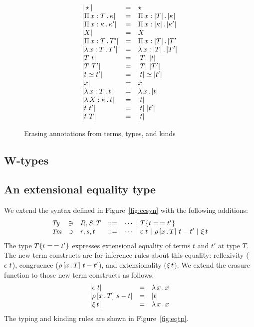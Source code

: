 \documentclass{article}
\begin{document}
\begin{figure}
  \[
  \begin{array}{lll}
    |\star| & = & \star \\
    |\Pia{x}{T}{\kappa}| & = & \Pia{x}{|T|}{|\kappa|} \\
    |\Pia{x}{\kappa}{\kappa'}| & = & \Pia{x}{|\kappa|}{|\kappa'|} \\
    |X| & = & X \\
    |\Pia{x}{T}{T'}| & = & \Pia{x}{|T|}{|T'} \\
    |\tlam{x}{T}{T'}| & = & \tlam{x}{|T|}{|T'|} \\
    |T\ t| & = & |T|\ |t| \\
    |T\ T'| & = & |T|\ |T'| \\
    |t \simeq t'| & = & |t| \simeq |t'| \\
    |x| & = & x \\
    |\tlam{x}{T}{t}| & = & \lam{x}{|t|} \\
    |\tlam{X}{\kappa}{t}| & = & |t| \\
    |t\ t'| & = & |t|\ |t'| \\
    |t\ T| & = & |t| 
  \end{array}
  \]
  \caption{Erasing annotations from terms, types, and kinds}
  \label{fig:erase}
\end{figure}


\subsection{W-types}


\subsection{An extensional equality type}

We extend the syntax defined in Figure~\ref{fig:ccsyn} with the following additions:
\[
\begin{array}{lllll}
  \textit{Ty} & \ni & R,S,T & ::= & \cdots\ |\ \eqtm{t}{T}{t'} \\
  \textit{Tm} & \ni & r,s,t & ::= & \cdots\ |\ \rfl{t}\ |\ \cng{x}{T}{t}{t'}\ |\ \ext{t}
\end{array}
\]
\noindent The type $\eqtm{t}{T}{t'}$ expresses extensional equality of terms $t$ and $t'$ at type $T$.  The new term constructs are for inference
rules about this equality: reflexivity ($\rfl{t}$), congruence ($\cng{x}{T}{t}{t'}$), and extensionality ($\ext{t}$).
We extend the erasure function to those new term constructs as follows:
\[
\begin{array}{lll}
  |\rfl{t}| & = & \lam{x}{x} \\
  |\cng{x}{T}{s}{t}| & = & |t| \\
  |\ext{t}| & = & \lam{x}{x}
\end{array}
\]
\noindent The typing and kinding rules are shown in
Figure~\ref{fig:eqtp}.
\end{document}
